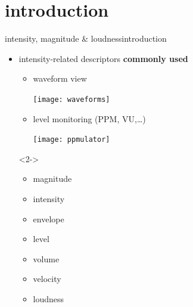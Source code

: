     \section[intro]{introduction}
        \begin{frame}{intensity, magnitude \& loudness}{introduction}
            \begin{itemize}
                \item   intensity-related descriptors \textbf{commonly used}
                    \begin{itemize}
                        \item	waveform view
                        
                            \texttt{[image: waveforms]}
                        \item	level monitoring (PPM, VU,\ldots)
                        
                            \texttt{[image: ppmulator]}
                     \end{itemize}
            \end{itemize}
            
            \vspace{-3mm}
            \begin{itemize}
                \item[]<2-> 
                \vspace{-3mm}
                 \begin{itemize}
                    \item	magnitude
                    \item	intensity
                    \item	envelope
                    \item	level
                    \item	volume
                    \item	velocity
                    \item	loudness
                 \end{itemize}
            \end{itemize}
            
                \vspace{-3mm}
        \end{frame}

